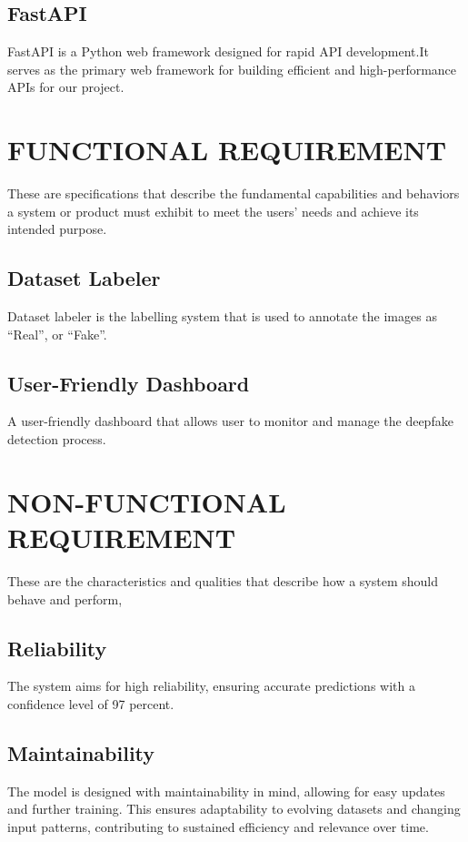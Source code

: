             \subsection*{FastAPI}
            FastAPI is a Python web framework designed for rapid API development.It serves as the primary web framework for building efficient and high-performance APIs for our project.
                
        \section{FUNCTIONAL REQUIREMENT}
            These are specifications that describe the fundamental capabilities and behaviors a system or product must exhibit to meet the users' needs and achieve its intended purpose. 

            \subsection{Dataset Labeler}
                Dataset labeler is the labelling system that is used to annotate the images as “Real”, or “Fake”.

            \subsection{User-Friendly Dashboard}
                A user-friendly dashboard that allows user to monitor and manage the deepfake detection process.

        \section{NON-FUNCTIONAL REQUIREMENT}
            These are the characteristics and qualities that describe how a system should behave and perform,

            \subsection{Reliability}
                The system aims for high reliability, ensuring accurate predictions with a confidence level of 97 percent.
            \subsection{Maintainability}
                The model is designed with maintainability in mind, allowing for easy updates and further training. This ensures adaptability to evolving datasets and changing input patterns, contributing to sustained efficiency and relevance over time.
